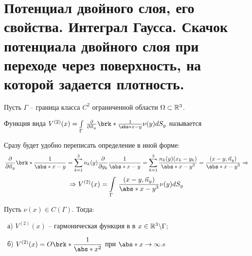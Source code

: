 \section{Потенциал двойного слоя, его свойства. Интеграл Гаусса. Скачок потенциала двойного слоя при переходе через поверхность, на которой задается плотность.}

Пусть $\Gamma$ -- граница класса $C^2$ ограниченной области $\Omega \subset \mathbb{R}^3$.

\begin{definition}
Функция вида
$V^{(2)}(x) = \int\limits_{\Gamma} \, \frac{\partial}{\partial \vec{n}_y}\brk*{\frac{1}{\abs*{x-y}}}\nu(y) dS_y $
называется \textit{}
\end{definition}

Сразу будет удобно переписать определение в иной форме:
$$ \frac{\partial}{\partial \vec{n}_y}\brk*{\frac{1}{\abs*{x-y}}} = \sum_{k=1}^3 n_k(y)\frac{\partial}{\partial y_k}\frac{1}{\abs*{x-y}} = \sum_{k=1}^3 \frac{n_k(y)(x_k - y_k)}{\abs*{x-y}^3} = \frac{(x-y, \vec{n}_y)}{\abs*{x-y}^3} \Rightarrow $$
$$ \Rightarrow V^{(2)}(x) = \int\limits_{\Gamma} \, \frac{(x-y, \vec{n}_y)}{\abs*{x-y}^3}\nu(y) dS_y $$

\begin{lemma} Пусть $\nu(x) \in C(\Gamma)$. Тогда:

\
а) $V^{(2)}(x)$ -- гармоническая функция в в $x\in \mathbb{R}^3\backslash \Gamma$;

\
б) $\displaystyle V^{(2)}(x) = O\brk*{\frac{1}{\abs*{x}^2}}$ при $\abs*{x} \rightarrow \infty$.s
\end{lemma}

